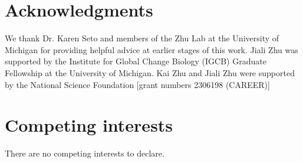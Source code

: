 
\section*{Acknowledgments}
We thank Dr. Karen Seto and members of the Zhu Lab at the University of Michigan for providing helpful advice at earlier stages of this work. Jiali Zhu was supported by the Institute for Global Change Biology (IGCB) Graduate Fellowship at the University of Michigan. Kai Zhu and Jiali Zhu were supported by the National Science Foundation [grant numbers 2306198 (CAREER)]

\section*{Competing interests}
There are no competing interests to declare.







